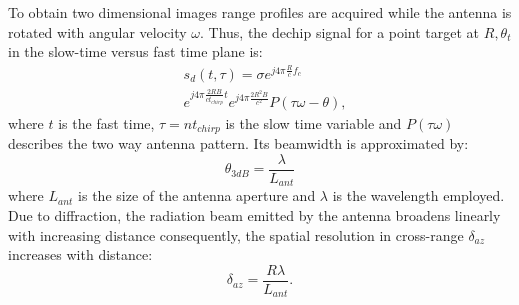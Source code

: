 To obtain two dimensional images range profiles are acquired while the antenna is rotated with angular velocity $\omega$.
Thus, the dechip signal for a point target at $R, \theta_{t}$ in the slow-time versus fast time plane is:
\begin{equation}\label{eq:signal_model}
	\begin{aligned}
	& s_{d}\left(t,\tau\right) = \sigma e^{j 4 \pi \frac{ R}{c}f_c}   \\
	& e^{j 4 \pi \frac{2 R B }{c t_{chirp}} t}  e^{j 4 \pi \frac{2 R^2 B}{c^2}} P\left(\tau \omega - \theta\right),
	\end{aligned}
\end{equation} 
where $t$ is the fast time, $\tau = n t_{chirp}$ is the slow time variable and $P\left(\tau \omega\right)$ describes the two way antenna pattern. Its beamwidth is approximated by:
\begin{equation}\label{eq:azimuth_resolution}
	\theta_{3dB} = \frac{\lambda}{L_{ant}}
\end{equation}
where $L_{ant}$ is the size of the antenna aperture and $\lambda$ is the wavelength employed.
Due to diffraction, the radiation beam emitted by the antenna broadens linearly with increasing distance consequently, the spatial resolution in cross-range $\delta_{az}$ increases with distance:
\begin{equation}\label{eq:azimuth_ground_resolution}
	\delta_{az} = \frac{R \lambda}{L_{ant}}.
\end{equation}
